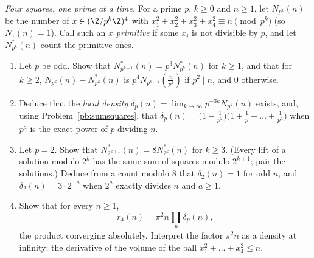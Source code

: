 \begin{exercise}[Journey]\label{pb:densities}
\emph{Four squares, one prime at a time.} For a prime $p$, $k\ge0$ and $n\ge1$, let $N_{p^k}(n)$ be the number of $x\in(\Z/p^k\Z)^4$ with
$x_1^2+x_2^2+x_3^2+x_4^2\equiv n\pmod{p^k}$ (so $N_1(n)=1$). Call such an $x$ \emph{primitive} if some $x_i$ is not divisible by $p$, and let $N^*_{p^k}(n)$ count the
primitive ones.
\begin{enumerate}[label=(\alph*)]
\item Let $p$ be odd. Show that $N^*_{p^{k+1}}(n)=p^3N^*_{p^k}(n)$ for $k\ge1$, and that for $k\ge2$, $N_{p^k}(n)-N^*_{p^k}(n)$ is $p^4N_{p^{k-2}}(\frac n{p^2})$ if
$p^2\mid n$, and $0$ otherwise.
\item Deduce that the \emph{local density} $\delta_p(n)=\lim_{k\to\infty}p^{-3k}N_{p^k}(n)$ exists, and, using Problem~\ref{pb:sumsquares}, that
$\delta_p(n)=\bigl(1-\frac1{p^2}\bigr)\bigl(1+\frac1p+\dots+\frac1{p^a}\bigr)$ when $p^a$ is the exact power of $p$ dividing $n$.
\item Let $p=2$. Show that $N^*_{2^{k+1}}(n)=8N^*_{2^k}(n)$ for $k\ge3$. (Every lift of a solution modulo $2^k$ has the same sum of squares modulo $2^{k+1}$; pair the
solutions.) Deduce from a count modulo $8$ that $\delta_2(n)=1$ for odd $n$, and $\delta_2(n)=3\cdot2^{-a}$ when $2^a$ exactly divides $n$ and $a\ge1$.
\item Show that for every $n\ge1$,
\[
r_4(n)=\pi^2n\prod_p\delta_p(n),
\]
the product converging absolutely. Interpret the factor $\pi^2n$ as a density at infinity: the derivative of the volume of the ball $x_1^2+\dots+x_4^2\le n$.
\end{enumerate}
\end{exercise}

